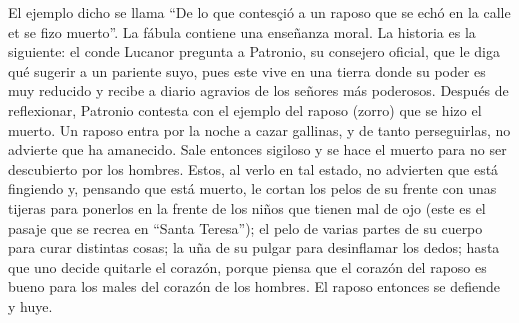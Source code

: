 \documentclass[14pt,twoside,final]{extbook} %
\begin{document}
El ejemplo dicho se llama ``De lo que contesçió a un raposo que se echó en la calle et se fizo muerto''. La fábula contiene una enseñanza moral. La historia es la siguiente: el conde Lucanor pregunta a Patronio, su consejero oficial, que le diga qué sugerir a un pariente suyo, pues este vive en una tierra donde su poder es muy reducido y recibe a diario agravios de los señores más poderosos. Después de reflexionar, Patronio contesta con el ejemplo del raposo (zorro) que se hizo el muerto. Un raposo entra por la noche a cazar gallinas, y de tanto perseguirlas, no advierte que ha amanecido. Sale entonces sigiloso y se hace el muerto para no ser descubierto por los hombres. Estos, al verlo en tal estado, no advierten que está fingiendo y, pensando que está muerto, le cortan los pelos de su frente con unas tijeras para ponerlos en la frente de los niños que tienen mal de ojo (este es el pasaje que se recrea en ``Santa Teresa''); el pelo de varias partes de su cuerpo para curar distintas cosas; la uña de su pulgar para desinflamar los dedos; hasta que uno decide quitarle el corazón, porque piensa que el corazón del raposo es bueno para los males del corazón de los hombres. El raposo entonces se defiende y huye.
\end{document}
